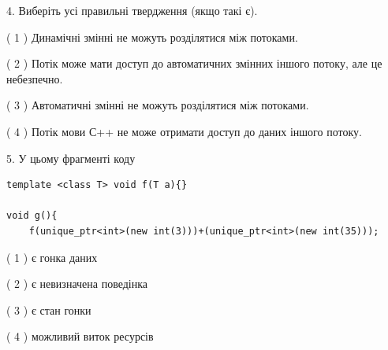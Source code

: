 \documentclass[12pt, ukrainian]{article}
\begin{document}
\begin {large}
{%
4. Виберіть усі правильні твердження (якщо такі є).\par
\vspace{2mm}

( 1 ) Динамічні змінні не можуть розділятися між потоками.%

( 2 ) Потік може мати доступ до автоматичних змінних іншого потоку, але це небезпечно.%

( 3 ) Автоматичні змінні не можуть розділятися між потоками.%

( 4 ) Потік мови С++ не може отримати доступ до даних іншого потоку.%


5. У цьому фрагменті коду
\begin{verbatim}
template <class T> void f(T a){}

void g(){
    f(unique_ptr<int>(new int(3)))+(unique_ptr<int>(new int(35)));
\end{verbatim}

( 1 ) є гонка даних%

( 2 ) є невизначена поведінка%

( 3 ) є стан гонки%

( 4 ) можливий виток ресурсів%
}
\end {large}
\end{document}
